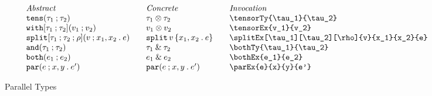 \documentclass[11pt]{article}
\begin{document}
\begin{figure}

  \begin{small}
    \begin{displaymath}
      \begin{array}{l@{\qquad}l@{\qquad}l@{\qquad}l}
        \textit{Abstract} & \textit{Concrete} & \textit{Invocation} \\
        \tensorTy{\tau_1}{\tau_2}                      & \tensorTy*{\tau_1}{\tau_2} & \verb|\tensorTy{\tau_1}{\tau_2}|                      \\
        \tensorEx{v_1}{v_2}                            & \tensorEx*{v_1}{v_2}       & \verb|\tensorEx{v_1}{v_2}|                            \\
        \splitEx[\tau_1][\tau_2][\rho]{v}{x_1}{x_2}{e} & \splitEx*{v}{x_1}{x_2}{e}  & \verb|\splitEx[\tau_1][\tau_2][\rho]{v}{x_1}{x_2}{e}| \\
        \bothTy{\tau_1}{\tau_2}                        & \bothTy*{\tau_1}{\tau_2}   & \verb|\bothTy{\tau_1}{\tau_2}|                        \\
        \bothEx{e_1}{e_2}                              & \bothEx*{e_1}{e_2}         & \verb|\bothEx{e_1}{e_2}|                              \\
        \parEx{e}{x}{y}{e'}                            & \parEx*{e}{x}{y}{e'}       & \verb|\parEx{e}{x}{y}{e'}|
      \end{array}
    \end{displaymath}
  \end{small}

  \caption{Parallel Types}
  \label{fig:par}
\end{figure}
\end{document}
